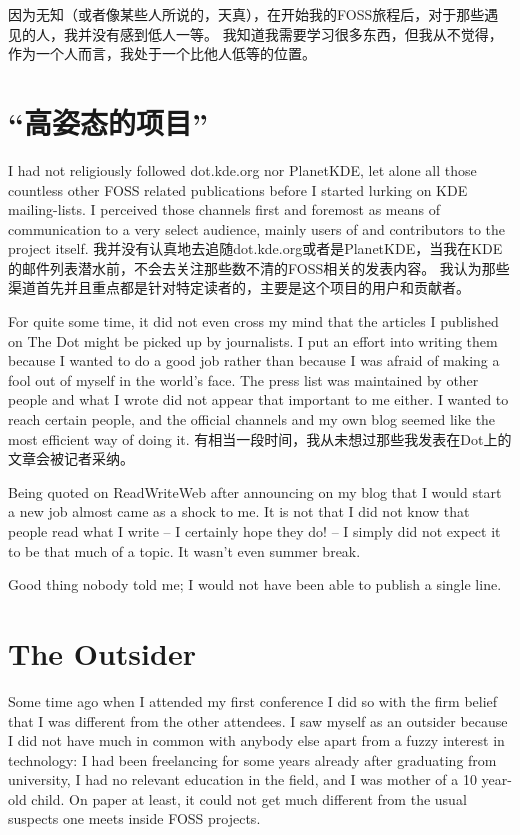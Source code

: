 因为无知（或者像某些人所说的，天真），在开始我的FOSS旅程后，对于那些遇见的人，我并没有感到低人一等。
我知道我需要学习很多东西，但我从不觉得，作为一个人而言，我处于一个比他人低等的位置。

\section*{“高姿态的项目”}

I had not religiously followed dot.kde.org nor PlanetKDE, let alone all those
countless other FOSS related publications before I started lurking on KDE
mailing-lists. I perceived those channels first and foremost as means of
communication to a very select audience, mainly users of and contributors to the
project itself. 
我并没有认真地去追随dot.kde.org或者是PlanetKDE，当我在KDE的邮件列表潜水前，不会去关注那些数不清的FOSS相关的发表内容。
我认为那些渠道首先并且重点都是针对特定读者的，主要是这个项目的用户和贡献者。

For quite some time, it did not even cross my mind that the articles I published
on The Dot might be picked up by journalists. I put an effort into writing them
because I wanted to do a good job rather than because I was afraid of making a
fool out of myself in the world's face. The press list was maintained by other
people and what I wrote did not appear that important to me either. I wanted to
reach certain people, and the official channels and my own blog seemed like the
most efficient way of doing it.
有相当一段时间，我从未想过那些我发表在Dot上的文章会被记者采纳。

Being quoted on ReadWriteWeb after announcing on my blog that I would start a
new job almost came as a shock to me. It is not that I did not know that people
read what I write -- I certainly hope they do! -- I simply did not expect it to
be that much of a topic. It wasn't even summer break.

Good thing nobody told me; I would not have been able to publish a single line.

\section*{The Outsider}

Some time ago when I attended my first conference I did so with the firm belief
that I was different from the other attendees. I saw myself as an outsider
because I did not have much in common with anybody else apart from a fuzzy
interest in technology: I had been freelancing for some years already after
graduating from university, I had no relevant education in the field, and I was
mother of a 10 year-old child. On paper at least, it could not get much
different from the usual suspects one meets inside FOSS projects.

